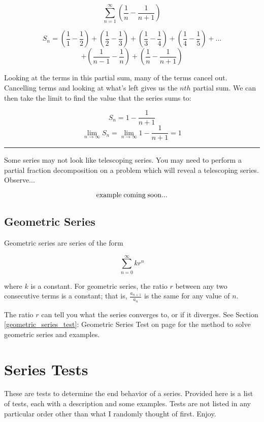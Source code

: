 \documentclass[12pt]{report}
\begin{document}
    $$ \sum_{n=1}^{\infty} \left( \frac{1}{n} - \frac{1}{n+1} \right) $$

    $$
        S_n = \left( \frac{1}{1} - \frac{1}{2} \right) + \left( \frac{1}{2} - \frac{1}{3} \right) +  \left( \frac{1}{3} - \frac{1}{4} \right) +  \left( \frac{1}{4} - \frac{1}{5} \right) + ...
    $$
    $$
        +  \left( \frac{1}{n-1} - \frac{1}{n} \right) +  \left( \frac{1}{n} - \frac{1}{n+1} \right)
    $$

Looking at the terms in this partial sum, many of the terms cancel out. Cancelling terms and looking at what's left gives us the $nth$ partial sum. We can then take the limit to find the value that the series sums to:

    $$ S_n = 1 - \frac{1}{n+1} $$
    $$ \lim_{n\to\infty} S_n = \lim_{n\to\infty} 1 - \frac{1}{n+1} = 1 $$

\noindent\rule{2cm}{0.4pt}


Some series may not look like telescoping series. You may need to perform a partial fraction decomposition on a problem which will reveal a telescoping series. Observe...

    $$
        \text{example\;coming\;soon...}
    $$


\section{Geometric Series}
Geometric series are series of the form 

    $$ \sum_{n=0}^{\infty} kr^n $$

where $k$ is a constant. For geometric series, the ratio $r$ between any two consecutive terms is a constant; that is, $ \frac{a_{n+1}}{a_n} $ is the same for any value of $n$.

The ratio $r$ can tell you what the series converges to, or if it diverges. See Section \ref{geometric_series_test}: Geometric Series Test on page \pageref{geometric_series_test} for the method to solve geometric series and examples.
















\chapter{Series Tests}
These are tests to determine the end behavior of a series. Provided here is a list of tests, each with a description and some examples. Tests are not listed in any particular order other than what I randomly thought of first. Enjoy.
\end{document}
